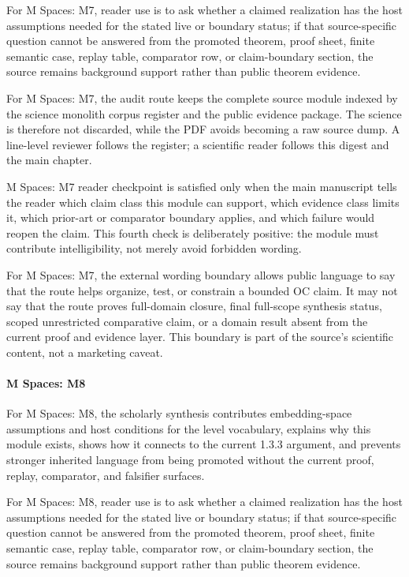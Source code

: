 For M Spaces: M7, reader use is to ask whether a claimed realization has the host assumptions needed for the stated live or boundary status; if that source-specific question cannot be answered from the promoted theorem, proof sheet, finite semantic case, replay table, comparator row, or claim-boundary section, the source remains background support rather than public theorem evidence.


For M Spaces: M7, the audit route keeps the complete source module indexed by the science monolith corpus register and the public evidence package. The science is therefore not discarded, while the PDF avoids becoming a raw source dump. A line-level reviewer follows the register; a scientific reader follows this digest and the main chapter.


M Spaces: M7 reader checkpoint is satisfied only when the main manuscript tells the reader which claim class this module can support, which evidence class limits it, which prior-art or comparator boundary applies, and which failure would reopen the claim. This fourth check is deliberately positive: the module must contribute intelligibility, not merely avoid forbidden wording.


For M Spaces: M7, the external wording boundary allows public language to say that the route helps organize, test, or constrain a bounded OC claim. It may not say that the route proves full-domain closure, final full-scope synthesis status, scoped unrestricted comparative claim, or a domain result absent from the current proof and evidence layer. This boundary is part of the source's scientific content, not a marketing caveat.


\paragraph{M Spaces: M8}

For M Spaces: M8, the scholarly synthesis contributes embedding-space assumptions and host conditions for the level vocabulary, explains why this module exists, shows how it connects to the current 1.3.3 argument, and prevents stronger inherited language from being promoted without the current proof, replay, comparator, and falsifier surfaces.


For M Spaces: M8, reader use is to ask whether a claimed realization has the host assumptions needed for the stated live or boundary status; if that source-specific question cannot be answered from the promoted theorem, proof sheet, finite semantic case, replay table, comparator row, or claim-boundary section, the source remains background support rather than public theorem evidence.


